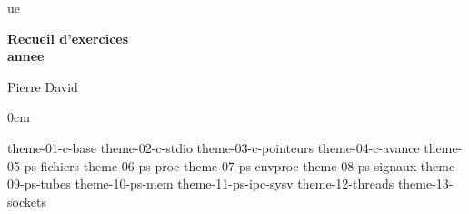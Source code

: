 \documentclass [twoside] {report}
\newcommand {\tassertoc} {{ \setlength {\parskip} {0cm} \tableofcontents }}
\newcommand {\marquerchapitre} [1]
    {
        \addcontentsline {toc} {chapter} {#1}
        \markboth {#1} {#1}
    }
\newcommand {\chapitresanstitre} [1]
    {
        \cleardoublepage
	\marquerchapitre {#1}
    }
\newcommand {\titrechapitre} [1]
    {
	\begin {center}
	    \Large \bf #1
	\end {center}
	\bigskip
	\bigskip
    }
\newcommand {\chapitre} [1]
    {
        \chapitresanstitre {#1}
        \titrechapitre {#1}
    }
\newcounter {td}
\newcounter {tp}
\newcounter {exercice} [tp]
\begin{document}
\thispagestyle {empty}

\begin {titlepage}
     {ue}

    \vfill

    \begin {center}
	\huge\bf
	Recueil d'exercices \\
	\vspace* {5mm}
	 {annee}
    \end {center}

    \vfill

    \begin {flushright}
	Pierre David
    \end {flushright}
\end {titlepage}

\cleardoublepage
\tassertoc


% 
% 
% 
% 
% 
% 
% 


 {theme-01-c-base}
 {theme-02-c-stdio}
 {theme-03-c-pointeurs}
 {theme-04-c-avance}
 {theme-05-ps-fichiers}
 {theme-06-ps-proc}
 {theme-07-ps-envproc}
 {theme-08-ps-signaux}
 {theme-09-ps-tubes}
 {theme-10-ps-mem}
 {theme-11-ps-ipc-sysv}
 {theme-12-threads}
 {theme-13-sockets}
\end{document}
